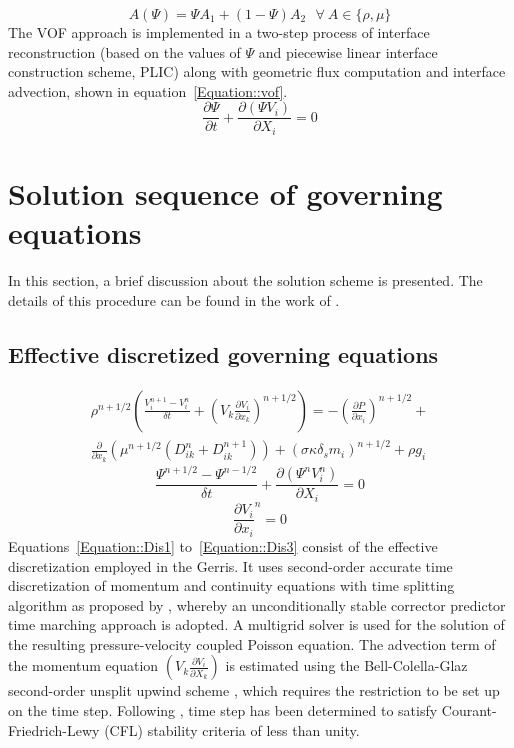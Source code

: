 \begin{equation} \label{Equation::general}
A (\Psi) = \Psi A_1 + (1-\Psi)A_2 \: \: \:  \forall  \: A \in \{\rho, \mu\}
\end{equation}
The VOF approach is implemented in a two-step process of interface reconstruction (based on the values of $\Psi$ and piecewise linear interface construction scheme, PLIC) along with geometric flux computation and interface advection, shown in equation~\ref{Equation::vof}.
\begin{equation} \label{Equation::vof}
\frac{\partial \Psi}{\partial t} + \frac{\partial(\Psi V_i)}{\partial X_i} = 0
\end{equation}
\section{Solution sequence of governing equations}
In this section, a brief discussion about the solution scheme is presented. The details of this procedure can be found in the work of \citet{Popinet2003,popinet2009}. 
\subsection{Effective discretized governing equations}
\begin{eqnarray}\label{Equation::Dis1}
\rho^{n+1/2}\left(\frac{V_i^{n+1} - V_i^{n}}{\delta t} + \left(V_k\frac{\partial V_i}{\partial x_k}\right)^{n+1/2}\right) = -\left(\frac{\partial P}{\partial x_i}\right)^{n+1/2} +\nonumber\\ \frac{\partial}{\partial x_k}\left(\mu^{n+1/2}\left(D_{ik}^{n} + D_{ik}^{n+1}\right)\right) + (\sigma\kappa\delta_sm_i)^{n+1/2} + \rho g_i
\end{eqnarray}
\begin{equation}\label{Equation::Dis2}
\frac{\Psi^{n+1/2} - \Psi^{n-1/2}}{\delta t} + \frac{\partial(\Psi^n V_i^n)}{\partial X_i} = 0
\end{equation}
\begin{equation}\label{Equation::Dis3}
\frac{\partial V_i}{\partial x_i}^n = 0
\end{equation}
Equations~\ref{Equation::Dis1} to~\ref{Equation::Dis3} consist of the effective discretization employed in the Gerris. It uses second-order accurate time discretization of momentum and continuity equations with time splitting algorithm as proposed by \citet{Chorin1968}, whereby an unconditionally stable corrector predictor time marching approach is adopted. A multigrid solver is used for the solution of the resulting pressure-velocity coupled Poisson equation. The advection term of the momentum equation $\left(V_k\frac{\partial V_i}{\partial X_k}\right)$ is estimated using the Bell-Colella-Glaz second-order unsplit upwind scheme \citep{bell1989second}, which requires the restriction to be set up on the time step. Following \citet{popinet2009}, time step has been determined to satisfy Courant-Friedrich-Lewy (CFL) stability criteria of less than unity. 
